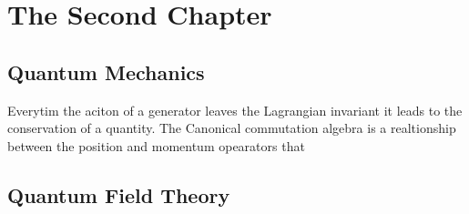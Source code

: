 \chapter{The Second Chapter}
\section{Quantum Mechanics}
Everytim the aciton of a generator leaves the Lagrangian invariant it leads to the conservation of a quantity. The Canonical commutation algebra is a realtionship between the position and momentum opearators that

\section{Quantum Field Theory}

